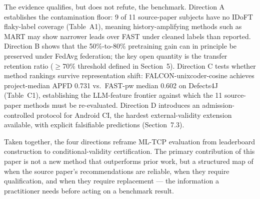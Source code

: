 \documentclass[conference]{IEEEtran}
\begin{document}
The evidence qualifies, but does not refute, the benchmark. Direction A establishes the contamination floor: 9 of 11 source-paper subjects have no IDoFT flaky-label coverage (Table~A1), meaning history-amplifying methods such as MART may show narrower leads over FAST under cleaned labels than reported. Direction B shows that the 50\%-to-80\% pretraining gain can in principle be preserved under FedAvg federation; the key open quantity is the transfer retention ratio ($\geq$70\% threshold defined in Section~5). Direction C tests whether method rankings survive representation shift: FALCON-unixcoder-cosine achieves project-median APFD 0.731 vs.\ FAST-pw median 0.602 on Defects4J (Table~C1), establishing the LLM-feature frontier against which the 11 source-paper methods must be re-evaluated. Direction D introduces an admission-controlled protocol for Android CI, the hardest external-validity extension available, with explicit falsifiable predictions (Section~7.3).

Taken together, the four directions reframe ML-TCP evaluation from leaderboard construction to conditional-validity certification. The primary contribution of this paper is not a new method that outperforms prior work, but a structured map of when the source paper's recommendations are reliable, when they require qualification, and when they require replacement --- the information a practitioner needs before acting on a benchmark result.
\end{document}
